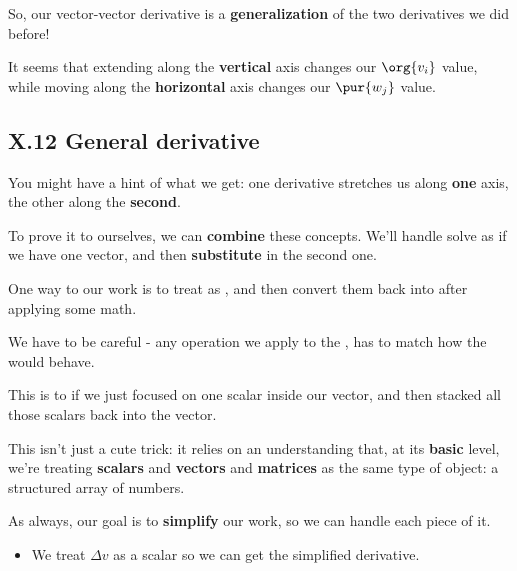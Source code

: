             So, our vector-vector derivative is a \textbf{generalization} of the two derivatives we did before! 
            
            It seems that extending along the \textbf{vertical} axis changes our $\org{v_i}$ value, while moving along the \textbf{horizontal} axis changes our $\pur{w_j}$ value.
         
    \secdiv
    
    \subsection*{X.12 \quad General derivative}  
        
        You might have a hint of what we get: one derivative stretches us along \textbf{one} axis, the other along the \textbf{second}.
        
        To prove it to ourselves, we can \textbf{combine} these concepts. We'll handle solve as if we have one vector, and then \textbf{substitute} in the second one.\\
        
        \begin{concept}
            One way to  our work is to treat  as , and then convert them back into  after applying some math.
            
            We have to be careful - any operation we apply to the , has to match how the  would behave.
            
            This is  to if we just focused on one scalar inside our vector, and then stacked all those scalars back into the vector.
        \end{concept}
        
        This isn't just a cute trick: it relies on an understanding that, at its \textbf{basic} level, we're treating \textbf{scalars} and \textbf{vectors} and \textbf{matrices} as the same type of object: a structured array of numbers.
        
        As always, our goal is to \textbf{simplify} our work, so we can handle each piece of it.
        
        \begin{itemize}
            \item We treat $\Delta v$ as a scalar so we can get the simplified derivative.
        \end{itemize}
            
